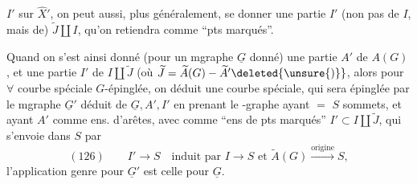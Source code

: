 $I'$ sur $\widehat X'$, on peut aussi, plus généralement, se donner une partie $I'$ (non pas de $I$, mais de) $\widetilde J\amalg I$, qu'on retiendra comme ``pts marqués''.

Quand on s'est ainsi donné (pour un mgraphe $\underline G$ donné) une partie $A'$ de $A(G)$, et une partie $I'$ de $I\amalg\widetilde J$ (où $\widetilde J=\widetilde A(G)-\widetilde A'\deleted{\unsure{)}}$, alors pour $\forall$ courbe spéciale $G$-épinglée, on déduit une courbe spéciale, qui sera épinglée par le mgraphe $\underline G'$ déduit de $\underline G,A',I'$ en prenant le -graphe  ayant $=$ $S$ sommets, et ayant $A'$ comme ens. d'arêtes, avec comme ``ens de pts marqués'' $I'\subset I\amalg\widetilde J$, qui s'envoie dans $S$  par
\[
(126)\qquad I'\longrightarrow S\quad\text{induit par }I\longrightarrow S\text{ et }\widetilde A(G)\xrightarrow{\text{origine}}S,
\]
l'application genre pour $\underline G'$ est celle pour $\underline G$.
